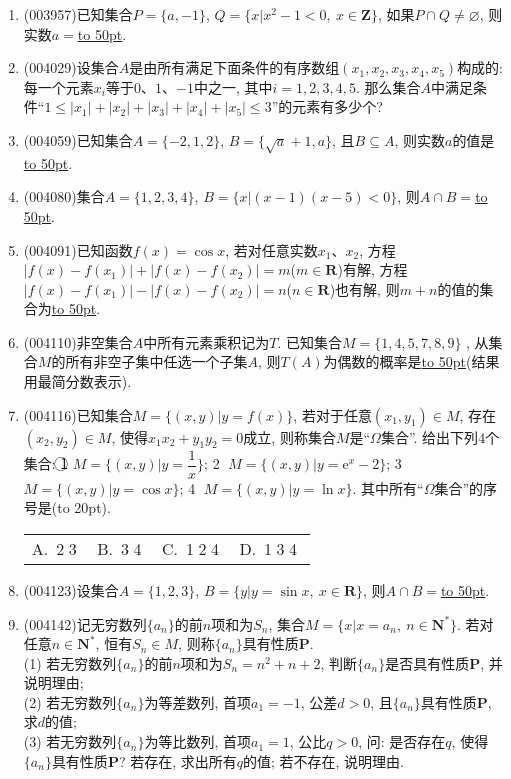 \documentclass[10pt,a4paper]{article}
\newcommand{\blank}[1]{\underline{\hbox to #1pt{}}}
\newcommand{\bracket}[1]{(\hbox to #1pt{})}
\newcommand{\fourch}[4]{\par\begin{tabular}{p{.23\textwidth}p{.23\textwidth}p{.23\textwidth}p{.23\textwidth}}
A.~#1 &B.~#2& C.~#3& D.~#4
\end{tabular}}
\begin{document}
\begin{enumerate}[1.]
\item {\tiny (003957)}已知集合$P=\{a,-1\}$, $Q=\{x|x^2-1<0, \ x\in \mathbf{Z}\}$, 如果$P\cap Q\ne\varnothing$, 则实数$a=$\blank{50}.
\item {\tiny (004029)}设集合$A$是由所有满足下面条件的有序数组$(x_1,x_2,x_3,x_4,x_5)$构成的: 每一个元素$x_i$等于$0$、$1$、$-1$中之一, 其中$i=1,2,3,4,5$. 那么集合$A$中满足条件``$1\le |x_1|+|x_2|+|x_3|+|x_4|+|x_5|\le 3$''的元素有多少个?
\item {\tiny (004059)}已知集合$A=\{-2,1,2\}$, $B=\{\sqrt a+1,a\}$, 且$B\subseteq A$, 则实数$a$的值是\blank{50}.
\item {\tiny (004080)}集合$A=\{1,2,3,4\}$, $B=\{x|(x-1)(x-5)<0\}$, 则$A\cap B=$\blank{50}.
\item {\tiny (004091)}已知函数$f(x)=\cos x$, 若对任意实数$x_1$、$x_2$, 方程$|f(x)-f(x_1)|+|f(x)-f(x_2)|=m$($m\in \mathbf{R}$)有解, 方程$|f(x)-f(x_1)|-|f(x)-f(x_2)|=n$($n\in \mathbf{R}$)也有解, 则$m+n$的值的集合为\blank{50}.
\item {\tiny (004110)}非空集合$A$中所有元素乘积记为$T$. 已知集合$M=\{1,4,5,7,8,9\}$ , 从集合$M$的所有非空子集中任选一个子集$A$, 则$T(A)$为偶数的概率是\blank{50}(结果用最简分数表示).
\item {\tiny (004116)}已知集合$M=\{(x,y)|y=f(x)\}$, 若对于任意$(x_1,y_1)\in M$, 存在$(x_2,y_2)\in M$, 使得$x_1x_2+y_1y_2=0$成立, 则称集合$M$是``$\Omega$集合''. 给出下列$4$个集合:
\textcircled{1} $M=\{(x,y) |y=\dfrac 1x \}$; \textcircled{2} $M=\{(x,y)|y=\mathrm{e}^x-2\}$; \textcircled{3} $M=\{(x,y)|y=\cos x\}$; \textcircled{4} $M=\{(x,y)|y=\ln x\}$.
其中所有``$\Omega$集合''的序号是\bracket{20}.
\fourch{\textcircled{2}\textcircled{3}}{\textcircled{3}\textcircled{4}}{\textcircled{1}\textcircled{2}\textcircled{4}}{\textcircled{1}\textcircled{3}\textcircled{4}}
\item {\tiny (004123)}设集合$A=\{1,2,3\}$, $B=\{y|y=\sin x, \ x\in \mathbf{R}\}$, 则$A\cap B=$\blank{50}.
\item {\tiny (004142)}记无穷数列$\{a_n\}$的前$n$项和为$S_n$, 集合$M=\{x|x=a_n, \ n\in \mathbf{N}^*\}$. 若对任意$n\in \mathbf{N}^*$, 恒有$S_n\in M$, 则称$\{a_n\}$具有性质$\mathbf{P}$.\\
(1) 若无穷数列$\{a_n\}$的前$n$项和为$S_n=n^2+n+2$, 判断$\{a_n\}$是否具有性质$\mathbf{P}$, 并说明理由;\\
(2) 若无穷数列$\{a_n\}$为等差数列, 首项$a_1=-1$, 公差$d>0$, 且$\{a_n\}$具有性质$\mathbf{P}$, 求$d$的值;\\
(3) 若无穷数列$\{a_n\}$为等比数列, 首项$a_1=1$, 公比$q>0$, 问: 是否存在$q$, 使得$\{a_n\}$具有性质$\mathbf{P}$? 若存在, 求出所有$q$的值; 若不存在, 说明理由.

\end{enumerate}
\end{document}
